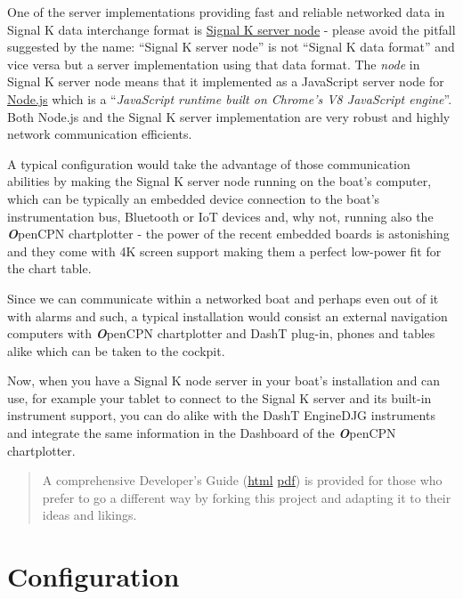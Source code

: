 \documentclass[11pt]{article}
\begin{document}
    One of the server implementations providing fast and reliable networked
data in Signal K data interchange format is
\href{https://github.com/SignalK/signalk-server-node}{Signal K server
node} - please avoid the pitfall suggested by the name: ``Signal K
server node'' is not ``Signal K data format'' and vice versa but a
server implementation using that data format. The \emph{node} in Signal
K server node means that it implemented as a JavaScript server node for
\href{https://nodejs.org/en/}{Node.js} which is a ``\emph{JavaScript
runtime built on Chrome's V8 JavaScript engine}''. Both Node.js and the
Signal K server implementation are very robust and highly network
communication efficients.

    A typical configuration would take the advantage of those communication
abilities by making the Signal K server node running on the boat's
computer, which can be typically an embedded device connection to the
boat's instrumentation bus, Bluetooth or IoT devices and, why not,
running also the \textbf{\emph{O}}penCPN chartplotter - the power of the
recent embedded boards is astonishing and they come with 4K screen
support making them a perfect low-power fit for the chart table.

    Since we can communicate within a networked boat and perhaps even out of
it with alarms and such, a typical installation would consist an
external navigation computers with \textbf{\emph{O}}penCPN chartplotter
and DashT plug-in, phones and tables alike which can be taken to the
cockpit.

    Now, when you have a Signal K node server in your boat's installation
and can use, for example your tablet to connect to the Signal K server
and its built-in instrument support, you can do alike with the DashT
EngineDJG instruments and integrate the same information in the
Dashboard of the \textbf{\emph{O}}penCPN chartplotter.

    \begin{quote}
A comprehensive Developer's Guide (\href{./developers/README.html}{html}
\textbar{} \href{./developers/README.pdf}{pdf}) is provided for those
who prefer to go a different way by forking this project and adapting it
to their ideas and likings.
\end{quote}

    \hypertarget{configuration}{%
\section{Configuration}\label{configuration}}
\end{document}
